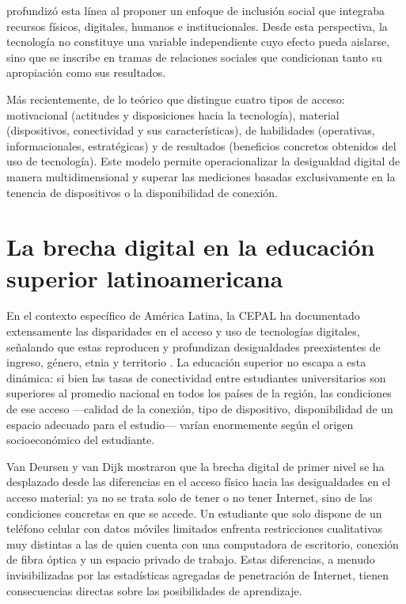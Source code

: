 \documentclass{article}
\begin{document}
\textcite{2562-WARSCHAUER2004} profundizó esta línea al proponer un enfoque de inclusión social que integraba recursos físicos, digitales, humanos e institucionales. Desde esta perspectiva, la tecnología no constituye una variable independiente cuyo efecto pueda aislarse, sino que se inscribe en tramas de relaciones sociales que condicionan tanto su apropiación como sus resultados.

Más recientemente, \textcite{2563-VANDIJK2020} de lo teórico que distingue cuatro tipos de acceso: motivacional (actitudes y disposiciones hacia la tecnología), material (dispositivos, conectividad y sus características), de habilidades (operativas, informacionales, estratégicas) y de resultados (beneficios concretos obtenidos del uso de tecnología). Este modelo permite operacionalizar la desigualdad digital de manera multidimensional y superar las mediciones basadas exclusivamente en la tenencia de dispositivos o la disponibilidad de conexión.


\section{La brecha digital en la educación superior latinoamericana}
En el contexto específico de América Latina, la CEPAL ha documentado extensamente las disparidades en el acceso y uso de tecnologías digitales, señalando que estas reproducen y profundizan desigualdades preexistentes de ingreso, género, etnia y territorio \autocite{2566-CEPAL2021}. La educación superior no escapa a esta dinámica: si bien las tasas de conectividad entre estudiantes universitarios son superiores al promedio nacional en todos los países de la región, las condiciones de ese acceso —calidad de la conexión, tipo de dispositivo, disponibilidad de un espacio adecuado para el estudio— varían enormemente según el origen socioeconómico del estudiante.

Van Deursen y van Dijk \autocite{2666-VANDEURSEN2019} mostraron que la brecha digital de primer nivel se ha desplazado desde las diferencias en el acceso físico hacia las desigualdades en el acceso material: ya no se trata solo de tener o no tener Internet, sino de las condiciones concretas en que se accede. Un estudiante que solo dispone de un teléfono celular con datos móviles limitados enfrenta restricciones cualitativas muy distintas a las de quien cuenta con una computadora de escritorio, conexión de fibra óptica y un espacio privado de trabajo. Estas diferencias, a menudo invisibilizadas por las estadísticas agregadas de penetración de Internet, tienen consecuencias directas sobre las posibilidades de aprendizaje.
\end{document}
